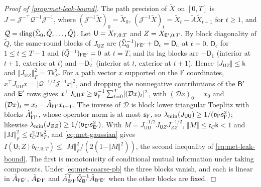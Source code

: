 \begin{proof}[Proof of \cref{prop:met-leak-bound}]
The path precision of $\tilde X$ on $[0,T]$ is $J=\mathcal J^{-\top}\mathcal Q^{-1}\mathcal J^{-1}$, where $(\mathcal J^{-1}\tilde X)_0=\tilde X_0$, $(\mathcal J^{-1}\tilde X)_t=\tilde X_t-\tilde A\tilde X_{t-1}$ for $t\ge1$, and $\mathcal Q=\operatorname{diag}(\tilde\Sigma_0,\tilde Q,\dots,\tilde Q)$. Let $\mathsf U=X_{\mathsf{I}',0:T}$ and $Z=X_{\mathsf{E}',0:T}$. By block diagonality of $\tilde Q$, the same-round blocks of $J_{\mathsf UZ}$ are $(\tilde\Sigma_0^{-1})_{\mathsf{I}'\mathsf{E}'}+\mathsf D_{\mathrm c}=\mathsf D_{\mathrm c}$ at $t=0$, $\mathsf D_{\mathrm c}$ for $1\le t\le T-1$ and $(\tilde Q^{-1})_{\mathsf{I}'\mathsf{E}'}=0$ at $t=T$, and its lag blocks are $-\mathsf D_1$ (interior at $t+1$, exterior at $t$) and $-\mathsf D_2^\top$ (interior at $t$, exterior at $t+1$). Hence $\Vert J_{\mathsf UZ}\Vert\le\mathsf k$ and $\Vert J_{\mathsf UZ}\Vert_F^2=T\mathsf k_F^2$. For a path vector $x$ supported on the $\mathsf{I}'$ coordinates, $x^\top J_{\mathsf U\mathsf U}x=\lvert\mathcal Q^{-1/2}\mathcal J^{-1}x\rvert^2$, and dropping the nonnegative contributions of the $\mathsf{B}'$ and $\mathsf{E}'$ rows gives $x^\top J_{\mathsf U\mathsf U}x\ge\mathfrak v_{\mathsf{I}'}^{-1}\sum_{t=0}^T\lvert(\mathcal Dx)_t\rvert^2$, with $(\mathcal Dx)_0=x_0$ and $(\mathcal Dx)_t=x_t-\tilde A_{\mathsf{I}'\mathsf{I}'}x_{t-1}$. The inverse of $\mathcal D$ is block lower triangular Toeplitz with blocks $\tilde A_{\mathsf{I}'\mathsf{I}'}^l$, whose operator norm is at most $\mathfrak s_{\mathsf{I}'}$, so $\lambda_{\min}(J_{\mathsf U\mathsf U})\ge1/(\mathfrak v_{\mathsf{I}'}\mathfrak s_{\mathsf{I}'}^2)$; likewise $\lambda_{\min}(J_{ZZ})\ge1/(\mathfrak v_{\mathsf{E}'}\mathfrak s_{\mathsf{E}'}^2)$. With $M=J_{\mathsf U\mathsf U}^{-1/2}J_{\mathsf UZ}J_{ZZ}^{-1/2}$, $\Vert M\Vert\le\mathfrak c_C\mathsf k<1$ and $\Vert M\Vert_F^2\le\mathfrak c_C^2T\mathsf k_F^2$, and \eqref{eq:met-gaussian} gives $I(\mathsf U;Z\mid b_{C,0:T})\le\Vert M\Vert_F^2/(2(1-\Vert M\Vert^2))$, the second inequality of \eqref{eq:met-leak-bound}. The first is monotonicity of conditional mutual information under taking components. Under \eqref{eq:met-coarse-pb} the three blocks vanish, and each is linear in $\tilde A_{\mathsf{I}'\mathsf{E}'}$, $\tilde A_{\mathsf{E}'\mathsf{I}'}$ and $\tilde A_{\mathsf{B}'\mathsf{I}'}^\top\tilde Q_{\mathsf{B}'}^{-1}\tilde A_{\mathsf{B}'\mathsf{E}'}$ when the other blocks are fixed.
\end{proof}


